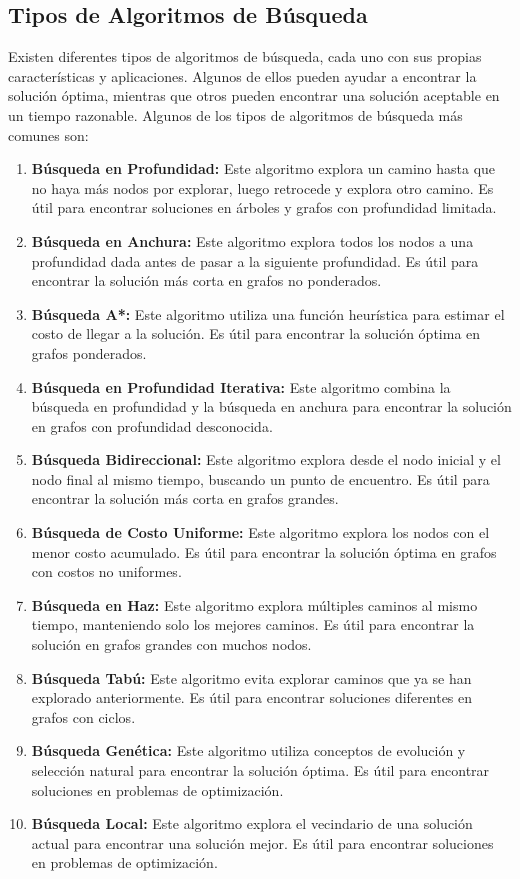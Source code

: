 \documentclass[11pt, a4paper]{article}
\begin{document}
  \newpage 

  \subsection{Tipos de Algoritmos de Búsqueda}

  Existen diferentes tipos de algoritmos de búsqueda, cada uno con sus propias características y aplicaciones.
  Algunos de ellos pueden ayudar a encontrar la solución óptima, mientras que otros pueden encontrar una solución aceptable en un tiempo razonable. Algunos de los tipos de algoritmos de búsqueda más comunes son:

  \begin{enumerate}
    \item \textbf{Búsqueda en Profundidad:} Este algoritmo explora un camino hasta que no haya más nodos por explorar, luego retrocede y explora otro camino. Es útil para encontrar soluciones en árboles y grafos con profundidad limitada.
    \item \textbf{Búsqueda en Anchura:} Este algoritmo explora todos los nodos a una profundidad dada antes de pasar a la siguiente profundidad. Es útil para encontrar la solución más corta en grafos no ponderados.
    \item \textbf{Búsqueda A*:} Este algoritmo utiliza una función heurística para estimar el costo de llegar a la solución. Es útil para encontrar la solución óptima en grafos ponderados.
    \item \textbf{Búsqueda en Profundidad Iterativa:} Este algoritmo combina la búsqueda en profundidad y la búsqueda en anchura para encontrar la solución en grafos con profundidad desconocida.
    \item \textbf{Búsqueda Bidireccional:} Este algoritmo explora desde el nodo inicial y el nodo final al mismo tiempo, buscando un punto de encuentro. Es útil para encontrar la solución más corta en grafos grandes.
    \item \textbf{Búsqueda de Costo Uniforme:} Este algoritmo explora los nodos con el menor costo acumulado. Es útil para encontrar la solución óptima en grafos con costos no uniformes.
    \item \textbf{Búsqueda en Haz:} Este algoritmo explora múltiples caminos al mismo tiempo, manteniendo solo los mejores caminos. Es útil para encontrar la solución en grafos grandes con muchos nodos.
    \item \textbf{Búsqueda Tabú:} Este algoritmo evita explorar caminos que ya se han explorado anteriormente. Es útil para encontrar soluciones diferentes en grafos con ciclos.
    \item \textbf{Búsqueda Genética:} Este algoritmo utiliza conceptos de evolución y selección natural para encontrar la solución óptima. Es útil para encontrar soluciones en problemas de optimización.
    \item \textbf{Búsqueda Local:} Este algoritmo explora el vecindario de una solución actual para encontrar una solución mejor. Es útil para encontrar soluciones en problemas de optimización.
  \end{enumerate}
\end{document}
